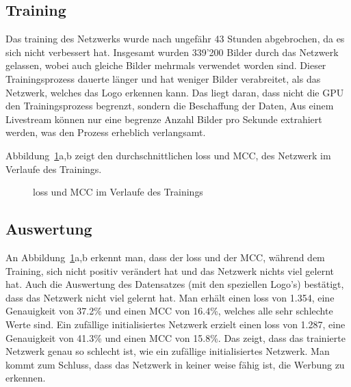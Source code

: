 \documentclass[12pt,a4paper]{report}
\begin{document}
\subsection{Training}
Das training des Netzwerks wurde nach ungefähr 43 Stunden abgebrochen, da es sich nicht verbessert hat.
Insgesamt wurden 339'200 Bilder durch das Netzwerk gelassen, wobei auch gleiche Bilder mehrmals verwendet worden sind.
Dieser Trainingsprozess dauerte länger und hat weniger Bilder verabreitet, als das Netzwerk, welches das Logo erkennen kann.
Das liegt daran, dass nicht die GPU den Trainingsprozess begrenzt, sondern die Beschaffung der Daten,
Aus einem Livestream können nur eine begrenze Anzahl Bilder pro Sekunde extrahiert werden, was den Prozess erheblich verlangsamt.

Abbildung~\ref{fig:loss2}a,b zeigt den durchschnittlichen loss und MCC,
des Netzwerk im Verlaufe des Trainings.
\begin{figure}[h]%
    \centering
    \qquad
    \caption{loss und MCC im Verlaufe des Trainings}%
    \label{fig:loss2}%
\end{figure}
\subsection{Auswertung}
An Abbildung~\ref{fig:loss2}a,b erkennt man,
dass der loss und der MCC, während dem Training, sich nicht positiv verändert hat und das Netzwerk nichts viel gelernt hat.
Auch die Auswertung des Datensatzes (mit den speziellen Logo's) bestätigt, dass das Netzwerk nicht viel gelernt hat.
Man erhält einen loss von 1.354, eine Genauigkeit von 37.2\% und einen MCC von 16.4\%, welches alle sehr schlechte Werte sind.
Ein zufällige initialisiertes Netzwerk erzielt einen loss von 1.287, eine Genauigkeit von 41.3\% und einen MCC von 15.8\%.
Das zeigt, dass das trainierte Netzwerk genau so schlecht ist, wie ein zufällige initialisiertes Netzwerk.
Man kommt zum Schluss, dass das Netzwerk in keiner weise fähig ist, die Werbung zu erkennen.
\end{document}
